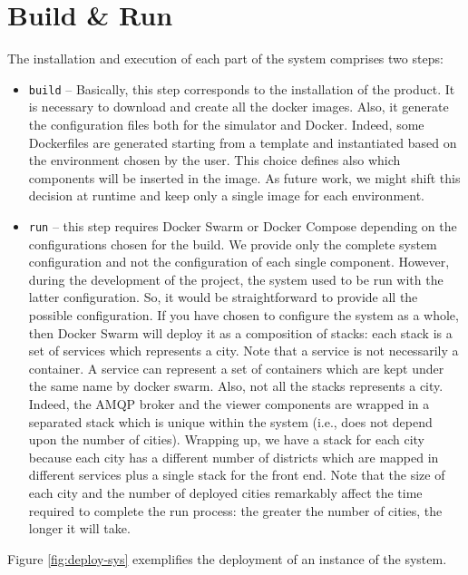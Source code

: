 \section{Build \& Run}
The installation and execution of each part of the system comprises two steps:

\begin{itemize}
   \item \texttt{build} --
   Basically, this step corresponds to the installation of the product.
   It is necessary to download and create all the docker
   images. Also, it generate the configuration files both for the simulator and
   Docker. Indeed, some Dockerfiles are generated starting from a template and
   instantiated based on the environment chosen by the user. This choice defines
   also which components will be inserted in the image. As future work,
   we might shift this decision at runtime and keep only a single image for each
   environment.
   \item \texttt{run} --
   this step requires Docker Swarm
	or Docker Compose depending on the configurations chosen for the build.
	We provide only the complete system configuration and not the
	configuration of each single component.
   However, during the development of the project,
	the system used to be run with the latter configuration.
	So, it would be straightforward to provide all the possible configuration.
	If you have chosen to configure the system as a whole, then Docker Swarm
   will deploy it as a composition of stacks:
   each stack is a set of services which represents
   a city. Note that a service is not necessarily a container.
   A service can represent a set of containers which are kept under the same
   name by docker swarm.
   Also, not all the stacks represents a city. Indeed, the AMQP broker
   and the viewer components are wrapped in a separated
   stack which is unique within the system (i.e., does not depend upon the
   number of cities). Wrapping up, we have a stack for each city because
   each city has a different number of districts which are mapped in different
   services plus a single stack for the front end.
   Note that the size of each city and the number of deployed
   cities remarkably affect the time required to complete the run process:
   the greater the number of cities, the longer it will take.
\end{itemize}

Figure \ref{fig:deploy-sys} exemplifies the deployment of an instance of the
system.

